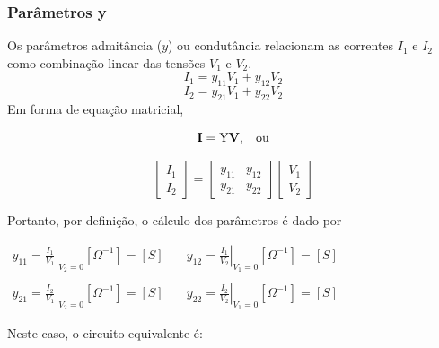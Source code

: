 \documentclass{article}
\numberwithin{equation}{section}
\begin{document}
\subsubsection{Parâmetros y}
\label{subsubsec:quadripolosy}
Os parâmetros admitância ($y$) ou condutância relacionam as correntes $I_{1}$ e $I_{2}$ como combinação linear das tensões $V_{1}$ e $V_{2}$.
\begin{equation*}
    I_{1}=y_{11}V_{1}+y_{12}V_{2}
\end{equation*}
\begin{equation*}
    I_{2}=y_{21}V_{1}+y_{22}V_{2}
\end{equation*}
Em forma de equação matricial,

\begin{equation*}
    \textbf{I}=\text{Y}\textbf{V}, \hspace{0.3cm} \text{ou}
\end{equation*}

\begin{equation}
    \begin{bmatrix}
        I_{1} \\
        I_{2}
    \end{bmatrix}
    = %
    \begin{bmatrix}
        y_{11} & y_{12} \\
        y_{21} & y_{22}
    \end{bmatrix}
    \begin{bmatrix}
        V_{1} \\
        V_{2}
    \end{bmatrix}
\end{equation}

\noindent Portanto, por definição, o cálculo dos parâmetros é dado por
\begin{center}
    $\begin{matrix} %
            y_{11}=\displaystyle\left.\frac{I_{1}}{V_{1}}\right|_{V_{2}=0} [\Omega^{-1}]=[S] &\quad y_{12}=\displaystyle\left.\frac{I_{1}}{V_{2}}\right|_{V_{1}=0} [\Omega^{-1}]=[S]\\ \\
            y_{21}=\displaystyle\left.\frac{I_{2}}{V_{1}}\right|_{V_{2}=0} [\Omega^{-1}]=[S] &\quad y_{22}=\displaystyle\left.\frac{I_{2}}{V_{2}}\right|_{V_{1}=0} [\Omega^{-1}]=[S]
    \end{matrix}$
\end{center}

Neste caso, o circuito equivalente é:
\end{document}
